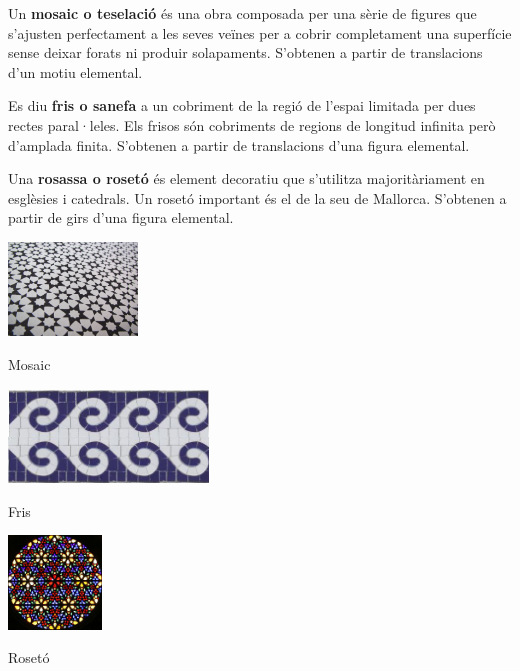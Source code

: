 \begin{theorybox}
	
	Un \textbf{mosaic o teselació} és una obra composada per una sèrie de figures que s'ajusten perfectament a les seves veïnes per a cobrir completament una superfície sense deixar forats ni produir solapaments. S'obtenen a partir de translacions d'un motiu elemental.
	
	
	Es diu \textbf{fris o sanefa} a un cobriment de la regió de l'espai limitada per dues rectes paral·leles. Els frisos són cobriments de regions de longitud infinita però d'amplada finita.  S'obtenen a partir de translacions d'una figura elemental.
	
	Una \textbf{rosassa o rosetó} és element decoratiu que s'utilitza majoritàriament en esglèsies i catedrals. Un rosetó important és el de la seu de Mallorca. S'obtenen a partir de girs d'una figura elemental.
	
	\begin{multicols}{3}
		\centering
		\footnotesize
		\includegraphics[height=2.5cm]{img-10/mosaico}
		
		Mosaic
		
		\includegraphics[height=2.5cm]{img-10/friso}
		
		Fris
		
		\includegraphics[height=2.5cm]{img-10/roseto}
		
		Rosetó
	\end{multicols}
	
	
\end{theorybox}

 

